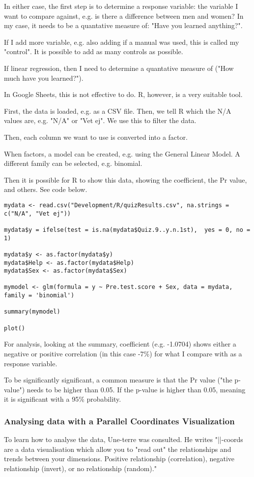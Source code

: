 In either case, the first step is to determine a response variable: the variable I want to compare against, e.g. is there a difference between men and women? In my case, it needs to be a quantative measure of: "Have you learned anything?".

If I add more variable, e.g. also adding if a manual was used, this is called my "control". It is possible to add as many controls as possible.

If linear regression, then I need to determine a quantative measure of ("How much have you learned?").

In Google Sheets, this is not effective to do. R, however, is a very suitable tool.

First, the data is loaded, e.g. as a CSV file. Then, we tell R which the N/A values are, e.g. "N/A" or "Vet ej". We use this to filter the data.

Then, each column we want to use is converted into a factor.

When factors, a model can be created, e.g. using the General Linear Model. A different family can be selected, e.g. binomial.

Then it is possible for R to show this data, showing the coefficient, the Pr value, and others. See code below.

\begin{verbatim}
mydata <- read.csv("Development/R/quizResults.csv", na.strings = c("N/A", "Vet ej"))

mydata$y = ifelse(test = is.na(mydata$Quiz.9..y.n.1st),  yes = 0, no = 1)

mydata$y <- as.factor(mydata$y)
mydata$Help <- as.factor(mydata$Help)
mydata$Sex <- as.factor(mydata$Sex)

mymodel <- glm(formula = y ~ Pre.test.score + Sex, data = mydata, family = 'binomial')

summary(mymodel)

plot()
\end{verbatim}

For analysis, looking at the summary, coefficient (e.g. -1.0704) shows either a negative or positive correlation (in this case -7\%) for what I compare with as a response variable.

To be significantly significant, a common measure is that the Pr value ("the p-value") needs to be higher than 0.05. If the p-value is higher than 0.05, meaning it is significant with a 95\% probability.

\subsubsection{Analysing data with a Parallel Coordinates Visualization}

To learn how to analyse the data, Une-terre \citep{une-terre} was consulted. %
He writes "||-coords are a data visualisation which allow you to "read out" the relationships and trends between your dimensions. Positive relationship (correlation), negative relationship (invert), or no relationship (random)."
